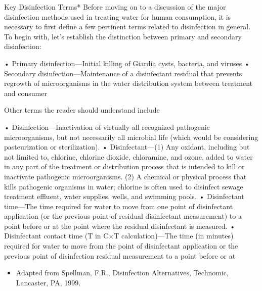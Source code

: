 \documentclass{article}
\begin{document}
Key Disinfection Terms* Before moving on to a discussion of the major
disinfection methods used in treating water for human consumption, it is
necessary to first define a few pertinent terms related to disinfection
in general. To begin with, let's establish the distinction between
primary and secondary disinfection:

• Primary disinfection---Initial killing of Giardia cysts, bacteria, and
viruses • Secondary disinfection---Maintenance of a disinfectant
residual that prevents regrowth of microorganisms in the water
distribution system between treatment and consumer

Other terms the reader should understand include

• Disinfection---Inactivation of virtually all recognized pathogenic
microorganisms, but not necessarily all microbial life (which would be
considering pasteurization or sterilization). • Disinfectant---(1) Any
oxidant, including but not limited to, chlorine, chlorine dioxide,
chloramine, and ozone, added to water in any part of the treatment or
distribution process that is intended to kill or inactivate pathogenic
microorganisms. (2) A chemical or physical process that kills pathogenic
organisms in water; chlorine is often used to disinfect sewage treatment
effluent, water supplies, wells, and swimming pools. • Disinfectant
time---The time required for water to move from one point of
disinfectant application (or the previous point of residual disinfectant
measurement) to a point before or at the point where the residual
disinfectant is measured. • Disinfectant contact time (T in C×T
calculation)---The time (in minutes) required for water to move from the
point of disinfectant application or the previous point of disinfection
residual measurement to a point before or at

\begin{itemize}
\item
  Adapted from Spellman, F.R., Disinfection Alternatives, Technomic,
  Lancaster, PA, 1999.
\end{itemize}
\end{document}
